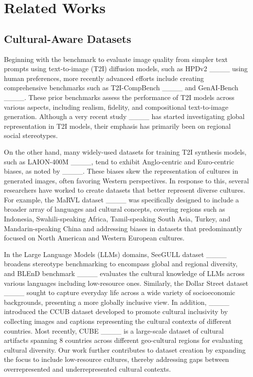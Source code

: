 \section{Related Works}
\subsection{Cultural-Aware Datasets}
Beginning with the benchmark to evaluate image quality from simpler text prompts using text-to-image (T2I) diffusion models, such as HPDv2  ____ using human preferences, more recently advanced efforts include creating comprehensive benchmarks such as T2I-CompBench  ____ and GenAI-Bench  ____. These prior benchmarks assess the performance of T2I models across various aspects, including realism, fidelity, and compositional text-to-image generation. Although a very recent study ____ has started investigating global representation in T2I models, their emphasis has primarily been on regional social stereotypes.

On the other hand, many widely-used datasets for training T2I synthesis models, such as LAION-400M  ____, tend to exhibit Anglo-centric and Euro-centric biases, as noted by  ____. These biases skew the representation of cultures in generated images, often favoring Western perspectives. In response to this, several researchers have worked to create datasets that better represent diverse cultures. For example, the MaRVL dataset  ____ was specifically designed to include a broader array of languages and cultural concepts, covering regions such as Indonesia, Swahili-speaking Africa, Tamil-speaking South Asia, Turkey, and Mandarin-speaking China and addressing biases in datasets that predominantly focused on North American and Western European cultures. 

In the Large Language Models (LLMs) domains, SeeGULL dataset  ____ broadens stereotype benchmarking to encompass global and regional diversity, and BLEnD benchmark  ____ evaluates the cultural knowledge of LLMs across various languages including low-resource ones.
Similarly, the Dollar Street dataset ____ sought to capture everyday life across a wide variety of socioeconomic backgrounds, presenting a more globally inclusive view. In addition, ____ introduced the CCUB dataset developed to promote cultural inclusivity by collecting images and captions representing the cultural contexts of different countries. Most recently, CUBE ____ is a large-scale dataset of cultural artifacts spanning 8 countries across different geo-cultural regions for evaluating cultural diversity. Our work further contributes to dataset creation by expanding the focus to include low-resource cultures, thereby addressing gaps between overrepresented and underrepresented cultural contexts.

